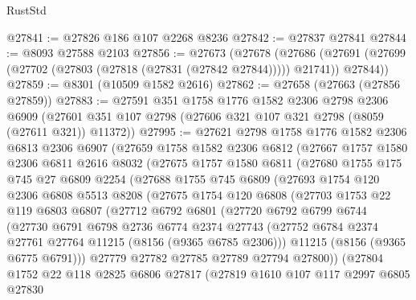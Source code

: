 \begin{lexlean}{RustStd}
\begin{coremodule}
@27841 := @27826 @186 @107 @2268 @8236
@27842 := @27837 @27841
@27844 := @8093 @27588 @2103
@27856 := @27673
    (@27678
      (@27686 (@27691 (@27699 (@27702 (@27803 (@27818 (@27831 (@27842 @27844))))) @21741)) @27844))
@27859 := @8301 (@10509 @1582 @2616)
@27862 := @27658 (@27663 (@27856 @27859))
@27883 := @27591
    @351
    @1758
    @1776
    @1582
    @2306
    @2798
    @2306
    @6909
    (@27601 @351 @107 @2798 (@27606 @321 @107 @321 @2798 (@8059 (@27611 @321)) @11372))
@27995 := @27621
    @2798
    @1758
    @1776
    @1582
    @2306
    @6813
    @2306
    @6907
    (@27659
      @1758
      @1582
      @2306
      @6812
      (@27667
        @1757
        @1580
        @2306
        @6811
        @2616
        @8032
        (@27675
          @1757
          @1580
          @6811
          (@27680
            @1755
            @175
            @745
            @27
            @6809
            @2254
            (@27688
              @1755
              @745
              @6809
              (@27693
                @1754
                @120
                @2306
                @6808
                @5513
                @8208
                (@27675
                  @1754
                  @120
                  @6808
                  (@27703
                    @1753
                    @22
                    @119
                    @6803
                    @6807
                    (@27712
                      @6792
                      @6801
                      (@27720
                        @6792
                        @6799
                        @6744
                        (@27730
                          @6791
                          @6798
                          @2736
                          @6774
                          @2374
                          @27743
                          (@27752 @6784 @2374 @27761 @27764 @11215 (@8156 (@9365 @6785 @2306)))
                          @11215
                          (@8156 (@9365 @6775 @6791)))
                        @27779
                        @27782
                        @27785
                        @27789
                        @27794
                        @27800))
                    (@27804
                      @1752
                      @22
                      @118
                      @2825
                      @6806
                      @27817
                      (@27819
                        @1610
                        @107
                        @117
                        @2997
                        @6805
                        @27830

\end{coremodule}
\end{lexlean}
